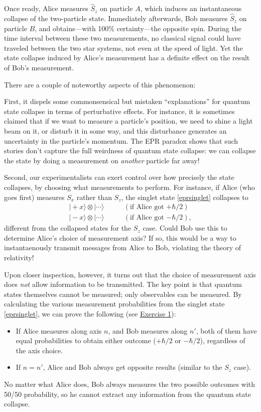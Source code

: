 \documentclass[pra,12pt]{revtex4-2}
\begin{document}
Once ready, Alice measures $\hat{S}_z$ on particle $A$, which induces
an instantaneous collapse of the two-particle state.  Immediately
afterwards, Bob measures $\hat{S}_z$ on particle $B$, and
obtains---with 100\% certainty---the opposite spin.  During the time
interval between these two measurements, no classical signal could
have traveled between the two star systems, not even at the speed of
light.  Yet the state collapse induced by Alice's measurement has a
definite effect on the result of Bob's measurement.

There are a couple of noteworthy aspects of this phenomenon:

First, it dispels some commonsensical but mistaken ``explanations''
for quantum state collapse in terms of perturbative effects.  For
instance, it is sometimes claimed that if we want to measure a
particle's position, we need to shine a light beam on it, or disturb
it in some way, and this disturbance generates an uncertainty in the
particle's momentum.  The EPR paradox shows that such stories don't
capture the full weirdness of quantum state collapse: we can collapse
the state by doing a measurement on \textit{another} particle far
away!

Second, our experimentalists can exert control over how precisely the
state collapses, by choosing what measurements to perform.  For
instance, if Alice (who goes first) measures $S_x$ rather than $S_z$,
the singlet state \eqref{eprsinglet} collapses to
\begin{align*}
  |\!+\!x\rangle \otimes |\cdots\rangle &\qquad(\textrm{if Alice got $+\hbar/2$}) \\
  |\!-\!x\rangle \otimes |\cdots\rangle &\qquad(\textrm{if Alice got $-\hbar/2$}),
\end{align*}
different from the collapsed states for the $S_z$ case.  Could Bob use
this to determine Alice's choice of measurement axis?  If so, this
would be a way to instantaenously transmit messages from Alice to Bob,
violating the theory of relativity!

Upon closer inspection, however, it turns out that the choice of
measurement axis does \textit{not} allow information to be
transmitted.  The key point is that quantum states themselves cannot
be measured; only observables can be measured.  By calculating the
various measurement probabilities from the singlet state
\eqref{eprsinglet}, we can prove the following (see
\hyperref[ex:singletproperties]{Exercise 1}):

\begin{itemize}
\item
  If Alice measures along axis $n$, and Bob measures along $n'$, both
  of them have equal probabilities to obtain either outcome
  ($+\hbar/2$ or $-\hbar/2$), regardless of the axis choice.

\item If $n = n'$, Alice and Bob always get opposite results (similar
  to the $S_z$ case).
\end{itemize}
No matter what Alice does, Bob always measures the two possible
outcomes with 50/50 probability, so he cannot extract any information
from the quantum state collapse.
\end{document}
